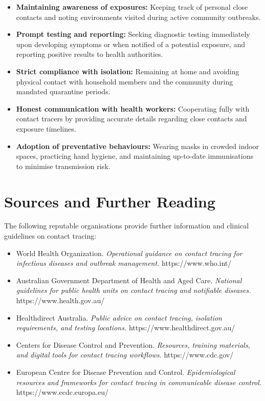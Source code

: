 \begin{itemize}
    \item \textbf{Maintaining awareness of exposures:} Keeping track of personal close contacts and noting environments visited during active community outbreaks.
    \item \textbf{Prompt testing and reporting:} Seeking diagnostic testing immediately upon developing symptoms or when notified of a potential exposure, and reporting positive results to health authorities.
    \item \textbf{Strict compliance with isolation:} Remaining at home and avoiding physical contact with household members and the community during mandated quarantine periods.
    \item \textbf{Honest communication with health workers:} Cooperating fully with contact tracers by providing accurate details regarding close contacts and exposure timelines.
    \item \textbf{Adoption of preventative behaviours:} Wearing masks in crowded indoor spaces, practicing hand hygiene, and maintaining up-to-date immunisations to minimise transmission risk.
\end{itemize}

\section*{Sources and Further Reading}
The following reputable organisations provide further information and clinical guidelines on contact tracing:

\begin{itemize}
    \item World Health Organization. \textit{Operational guidance on contact tracing for infectious diseases and outbreak management.} https://www.who.int/
    \item Australian Government Department of Health and Aged Care. \textit{National guidelines for public health units on contact tracing and notifiable diseases.} https://www.health.gov.au/
    \item Healthdirect Australia. \textit{Public advice on contact tracing, isolation requirements, and testing locations.} https://www.healthdirect.gov.au/
    \item Centers for Disease Control and Prevention. \textit{Resources, training materials, and digital tools for contact tracing workflows.} https://www.cdc.gov/
    \item European Centre for Disease Prevention and Control. \textit{Epidemiological resources and frameworks for contact tracing in communicable disease control.} https://www.ecdc.europa.eu/
\end{itemize}
